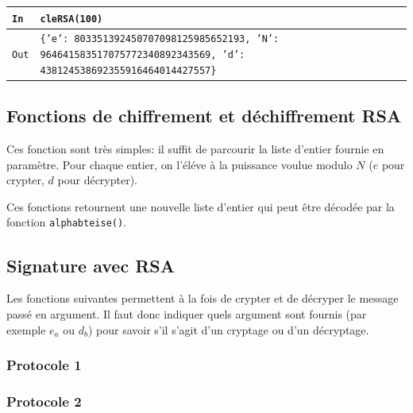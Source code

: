\documentclass[titlepage]{article}
\begin{document}
    
    

    \begin{tabularx}{12cm}{|p{0.60cm}|X|}
        \hline
        \rowcolor{gray}
        \texttt{In}
        & 
        \texttt{cleRSA(100)}
        \\
        \hline
        \texttt{Out}
        &
        \texttt{\{'e': 803351392450707098125985652193,\newline
        'N': 964641583517075772340892343569,\newline
        'd': 438124538692355916464014427557\}}
        \\
        \hline
    \end{tabularx}
    \bigbreak

    \subsection{Fonctions de chiffrement et déchiffrement RSA}
    Ces fonction sont très simples: il suffit de parcourir la liste d'entier fournie en paramètre. Pour chaque entier, on l'éléve à la puissance voulue modulo $N$ ($e$ pour crypter, $d$ pour décrypter).

    

    

    Ces fonctions retournent une nouvelle liste d'entier qui peut être décodée par la fonction \texttt{alphabteise()}.

    \subsection{Signature avec RSA}
    Les fonctions suivantes permettent à la fois de crypter et de décryper le message passé en argument. 
    Il faut donc indiquer quels argument sont fournis (par exemple $e_a$ ou $d_b$) pour savoir s'il s'agit d'un cryptage ou d'un décryptage.
    \subsubsection{Protocole 1}

    

    \subsubsection{Protocole 2}
\end{document}
